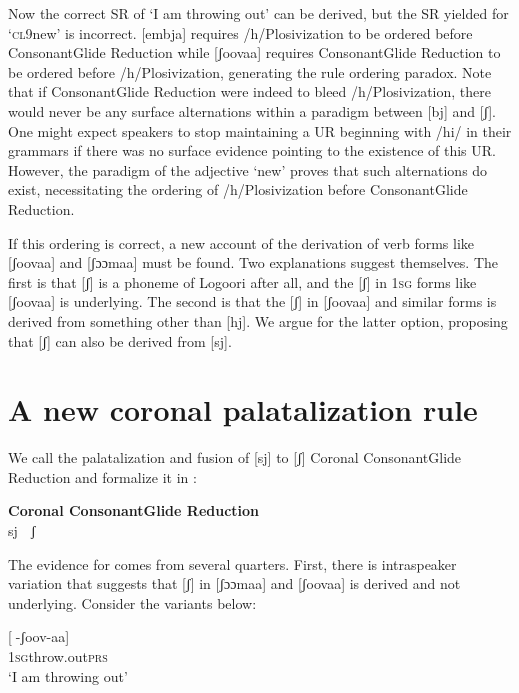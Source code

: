 \documentclass[output=paper]{langsci/langscibook}
\begin{document}
Now the correct SR of ‘I am throwing out’ can be derived, but the SR yielded for ‘\textsc{cl}9new’ is incorrect. [embja] requires /h/Plosivization to be ordered before ConsonantGlide Reduction while [ʃoovaa] requires ConsonantGlide Reduction to be ordered before /h/Plosivization, generating the rule ordering paradox. Note that if ConsonantGlide Reduction were indeed to bleed /h/Plosivization, there would never be any surface alternations within a paradigm between [bj] and [ʃ]. One might expect speakers to stop maintaining a UR beginning with /hi/ in their grammars if there was no surface evidence pointing to the existence of this UR. However, the paradigm of the adjective ‘new’ proves that such alternations do exist, necessitating the ordering of /h/Plosivization before ConsonantGlide Reduction. 

If this ordering is correct, a new account of the derivation of verb forms like [ʃoovaa] and [ʃɔɔmaa] must be found. Two explanations suggest themselves. The first is that [ʃ] is a phoneme of Logoori after all, and the [ʃ] in 1\textsc{sg} forms like [ʃoovaa] is underlying. The second is that the [ʃ] in [ʃoovaa] and similar forms is derived from something other than [hj]. We argue for the latter option, proposing that [ʃ] can also be derived from [sj].

\section{A new coronal palatalization rule}

We call the palatalization and fusion of [sj] to [ʃ] Coronal ConsonantGlide Reduction and formalize it in :


 

\ea{}
 \textbf{Coronal ConsonantGlide Reduction}\\
 sj  ʃ\\{}
\z



The evidence for  comes from several quarters. First, there is intraspeaker variation that suggests that [ʃ] in [ʃɔɔmaa] and [ʃoovaa] is derived and not underlying. Consider the variants below:
 
\ea{}
 [-ʃoov-aa]\\{}
\textsc{1sg}throw.out\textsc{prs}\\{}
\glt ‘I am throwing out’
\z
\end{document}
